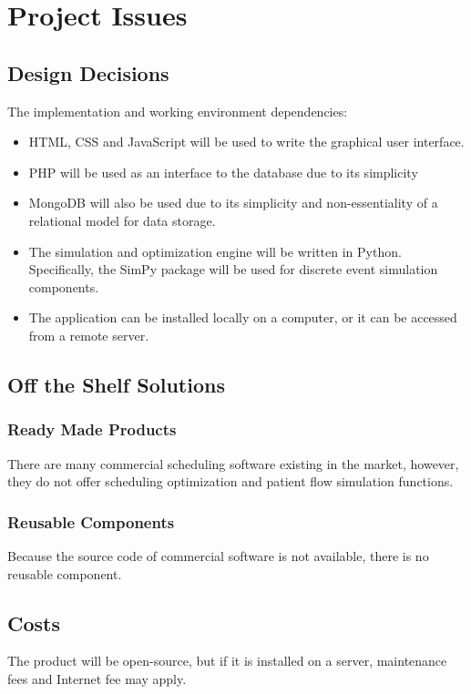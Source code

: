 \documentclass[12pt, titlepage]{article}
\begin{document}
\section{Project Issues}
\subsection{Design Decisions}
The implementation and working environment dependencies:
\begin{itemize}
  \item HTML, CSS and JavaScript will be used to write the graphical user interface.
  \item PHP will be used as an interface to the database due to its simplicity
  \item MongoDB will also be used due to its simplicity and non-essentiality of a relational model for data storage. 
  \item The simulation and optimization engine will be written in Python. Specifically, the SimPy package will be used for discrete event simulation components.
  \item The application can be installed locally on a computer, or it can be  
  	accessed from a remote server.
\end{itemize}

\subsection{Off the Shelf Solutions}
\subsubsection{Ready Made Products}
There are many commercial scheduling software existing in the market, however, they do not offer scheduling optimization and patient flow simulation functions.

\subsubsection{Reusable Components}
Because the source code of commercial software is not available, there is no reusable component.

\subsection{Costs}
The product will be open-source, but if it is installed on a server, maintenance fees and Internet fee may apply.
\end{document}
